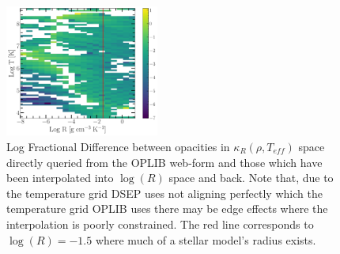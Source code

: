 \begin{figure}
	\centering
	\includegraphics[width=0.45\textwidth]{src/figures/FractionalDifference.pdf}
	\caption{Log Fractional Difference between opacities in $\kappa_{R}(\rho,
	T_{eff})$ space directly queried from the OPLIB web-form and those which
	have been interpolated into $\log(R)$ space and back. Note that, due to the
	temperature grid DSEP uses not aligning perfectly which the temperature
	grid OPLIB uses there may be edge effects where the interpolation is poorly
	constrained. The red line corresponds to $\log(R) = -1.5$ where much of a
	stellar model's radius exists.}
	\label{fig:fracdiff}
\end{figure}

